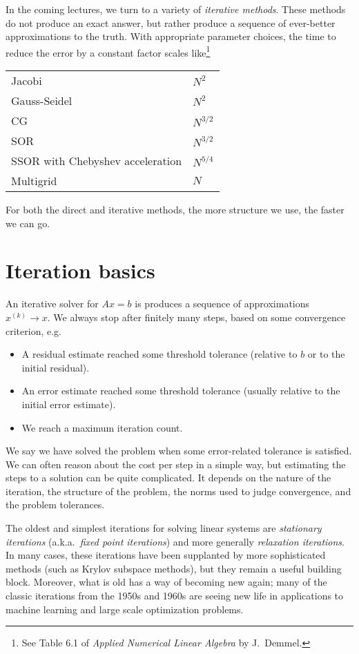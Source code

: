 \documentclass[12pt, leqno]{article} %
\begin{document}
In the coming lectures, we turn to a variety of {\em iterative methods}.
These methods do not produce an exact answer, but rather produce a
sequence of ever-better approximations to the truth.
With appropriate parameter choices,
the time to reduce the error by a constant factor scales
like\footnote{%
See Table 6.1 of {\em Applied Numerical Linear Algebra} by J.~Demmel.}
\begin{center}
\begin{tabular}{ll}
  Jacobi & $N^2$ \\
  Gauss-Seidel & $N^2$ \\
  CG & $N^{3/2}$ \\
  SOR & $N^{3/2}$ \\
  SSOR with Chebyshev acceleration & $N^{5/4}$ \\
  Multigrid & $N$
\end{tabular}
\end{center}
For both the direct and iterative methods, the more structure we use,
the faster we can go.

\section{Iteration basics}

An iterative solver for $Ax = b$ is produces a sequence of
approximations $x^{(k)} \rightarrow x$.  We always stop after
finitely many steps, based on some convergence criterion, e.g.
\begin{itemize}
\item A residual estimate reached some threshold tolerance
  (relative to $b$ or to the initial residual).
\item An error estimate reached some threshold tolerance
  (usually relative to the initial error estimate).
\item We reach a maximum iteration count.
\end{itemize}
We say we have solved the problem when some error-related tolerance
is satisfied.  We can often reason about the cost per step in a
simple way, but estimating the steps to a solution can be
quite complicated.  It depends on the nature of the iteration, the
structure of the problem, the norms used to judge convergence, and
the problem tolerances.

The oldest and simplest iterations for solving linear systems are
{\em stationary iterations} (a.k.a.~{\em fixed point iterations})
and more generally {\em relaxation iterations}.
In many cases, these iterations have been supplanted by more
sophisticated methods (such as Krylov subspace methods), but they
remain a useful building block.  Moreover, what is old has a way of
becoming new again; many of the classic iterations from the 1950s
and 1960s are seeing new life in applications to machine learning
and large scale optimization problems.
\end{document}
